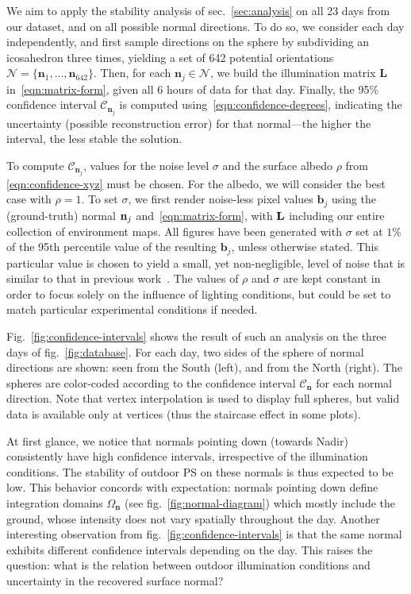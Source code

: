 We aim to apply the stability analysis of sec.~\ref{sec:analysis} on all 23 days from our dataset, and on all possible normal directions. To do so, we consider each day independently, and first sample directions on the sphere by subdividing an icosahedron three times, yielding a set of 642 potential orientations $\mathcal{N} = \{\mathbf{n}_1, ..., \mathbf{n}_{642} \}$. Then, for each $\mathbf{n}_j \in \mathcal{N}$, we build the illumination matrix $\mathbf{L}$ in~\eqref{eqn:matrix-form}, given all 6 hours of data for that day. Finally, the 95\% confidence interval $\mathcal{C}_{\mathbf{n}_j}$ is computed using~\eqref{eqn:confidence-degrees}, indicating the uncertainty (possible reconstruction error) for that normal---the higher the interval, the less stable the solution.

To compute $\mathcal{C}_{\mathbf{n}_j}$, values for the noise level $\sigma$ and the surface albedo $\rho$ from \eqref{eqn:confidence-xyz} must be chosen. For the albedo, we will consider the best case with $\rho=1$. To set $\sigma$, we first render noise-less pixel values $\mathbf{b}_j$ using the (ground-truth) normal ${\bf n}_j$ and~\eqref{eqn:matrix-form}, with ${\bf L}$ including our entire collection of environment maps. All figures have been generated with $\sigma$ set at $1\%$ of the 95th percentile value of the resulting $\mathbf{b}_j$, unless otherwise stated. This particular value is chosen to yield a small, yet non-negligible, level of noise that is similar to that in previous work~\cite{klaudiny-prl-14}. The values of $\rho$ and $\sigma$ are kept constant in order to focus solely on the influence of lighting conditions, but could be set to match particular experimental conditions if needed.

Fig.~\ref{fig:confidence-intervals} shows the result of such an analysis on the three days of fig.~\ref{fig:database}. For each day, two sides of the sphere of normal directions are shown: seen from the South (left), and from the North (right). The spheres are color-coded according to the confidence interval $\mathcal{C}_\mathbf{n}$ for each normal direction. Note that vertex interpolation is used to display full spheres, but valid data is available only at vertices (thus the staircase effect in some plots).

At first glance, we notice that normals pointing down (towards Nadir) consistently have high confidence intervals, irrespective of the illumination conditions. The stability of outdoor PS on these normals is thus expected to be low. This behavior concords with expectation: normals pointing down define integration domains $\Omega_{\mathbf{n}}$ (see fig.~\ref{fig:normal-diagram}) which mostly include the ground, whose intensity does not vary spatially throughout the day. Another interesting observation from fig.~\ref{fig:confidence-intervals} is that the same normal exhibits different confidence intervals depending on the day. This raises the question: what is the relation between outdoor illumination conditions and uncertainty in the recovered surface normal?


